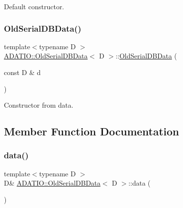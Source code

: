 Default constructor. 

\mbox{\label{classADATIO_1_1OldSerialDBData_ada293b92b5081fbb6e82364196ff5524}} 
\subsubsection{\texorpdfstring{OldSerialDBData()}{OldSerialDBData()}\hspace{0.1cm}{\footnotesize\ttfamily [6/6]}}
{\footnotesize\ttfamily template$<$typename D $>$ \\
\mbox{\hyperlink{classADATIO_1_1OldSerialDBData}{A\+D\+A\+T\+I\+O\+::\+Old\+Serial\+D\+B\+Data}}$<$ D $>$\+::\mbox{\hyperlink{classADATIO_1_1OldSerialDBData}{Old\+Serial\+D\+B\+Data}} (\begin{DoxyParamCaption}\item[{const D \&}]{d }\end{DoxyParamCaption})\hspace{0.3cm}{\ttfamily [inline]}}



Constructor from data. 



\subsection{Member Function Documentation}
\mbox{\label{classADATIO_1_1OldSerialDBData_ad917fd5898616290b7c0d30cb878850f}} 
\subsubsection{\texorpdfstring{data()}{data()}\hspace{0.1cm}{\footnotesize\ttfamily [1/6]}}
{\footnotesize\ttfamily template$<$typename D $>$ \\
D\& \mbox{\hyperlink{classADATIO_1_1OldSerialDBData}{A\+D\+A\+T\+I\+O\+::\+Old\+Serial\+D\+B\+Data}}$<$ D $>$\+::data (\begin{DoxyParamCaption}{ }\end{DoxyParamCaption})\hspace{0.3cm}{\ttfamily [inline]}}



